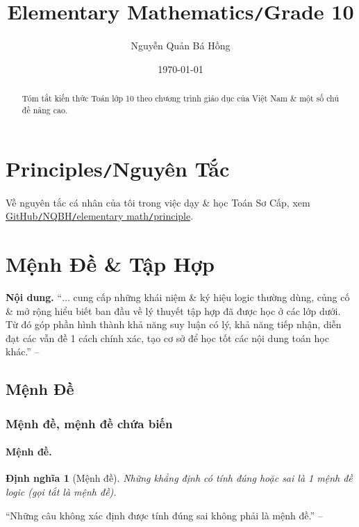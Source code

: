 \documentclass{article}
\title{Elementary Mathematics\texttt{/}Grade 10}
\author{Nguyễn Quản Bá Hồng}
\date{\today}
\numberwithin{equation}{section}
\newtheorem{definition}{Định nghĩa}[section]
\begin{document}
\maketitle
\begin{abstract}
	Tóm tắt kiến thức Toán lớp 10 theo chương trình giáo dục của Việt Nam \& một số chủ đề nâng cao.
\end{abstract}
\setcounter{secnumdepth}{4}
\setcounter{tocdepth}{3}
\tableofcontents


\section*{Principles\texttt{/}Nguyên Tắc}
Về nguyên tắc cá nhân của tôi trong việc dạy \& học Toán Sơ Cấp, xem \href{https://github.com/NQBH/hobby/blob/master/elementary_math/principle/NQBH_elementary_math_principle.pdf}{GitHub\texttt{/}NQBH\texttt{/}elementary math\texttt{/}principle}.


\section{Mệnh Đề \& Tập Hợp}
\textbf{Nội dung.} ``$\ldots$ cung cấp những khái niệm \& ký hiệu logic thường dùng, củng cố \& mở rộng hiểu biết ban đầu về lý thuyết tập hợp đã được học ở các lớp dưới. Từ đó góp phần hình thành khả năng suy luận có lý, khả năng tiếp nhận, diễn đạt các vẫn đề 1 cách chính xác, tạo cơ sở để học tốt các nội dung toán học khác.'' -- \cite[p. 5]{Khoai_Anh_Tan_Thang_Anh_Cuong_Duong_Dang_Ha_Hanh_Hong_Son_Tuan_Vuong_Toan_10_tap_1}

\subsection{Mệnh Đề}

\subsubsection{Mệnh đề, mệnh đề chứa biến}

\paragraph{Mệnh đề.}
\begin{definition}[Mệnh đề]
	Những khẳng định có tính đúng hoặc sai là 1 \emph{mệnh đề logic} (gọi tắt là \emph{mệnh đề}).
\end{definition}
``Những câu không xác định được tính đúng sai không phải là mệnh đề.'' -- \cite[p. 6]{Khoai_Anh_Tan_Thang_Anh_Cuong_Duong_Dang_Ha_Hanh_Hong_Son_Tuan_Vuong_Toan_10_tap_1}
\end{document}
